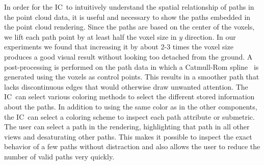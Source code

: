 \documentclass[conference,10pt,letter]{IEEEtran}
\def\IC{IC}
\begin{document}

%
%
 In order for the \IC\ to intuitively understand the spatial relationship of paths in the point cloud data, it is useful and necessary to show the paths embedded in the point cloud rendering. Since the paths are based on the center of the voxels, we lift each path point by at least half the voxel size in $y$ direction. In our experiments we found that increasing it by about 2-3 times the voxel size produces a good visual result without looking too detached from the ground. A post-processing is performed on the path data in which a Catmull-Rom spline~\cite{catmull1974class} is generated using the voxels as control points. This results in a smoother path that lacks discontinuous edges that would otherwise draw unwanted attention. The \IC\ can select various coloring methods to select the different stored information about the paths. In addition to using the same color as in the other components, the \IC\ can select a coloring scheme to inspect each path attribute or submetric. The user can select a path in the rendering, highlighting that path in all other views and desaturating other paths. This makes it possible to inspect the exact behavior of a few paths without distraction and also allows the user to reduce the number of valid paths very quickly.
%
\end{document}
